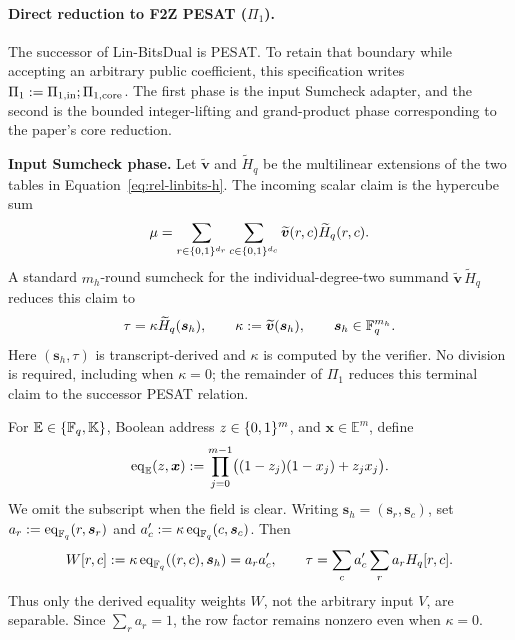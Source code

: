 \paragraph{Direct reduction to F2Z PESAT ($\Pi_1$).}
The successor of Lin-BitsDual is PESAT.  To retain that boundary while accepting an arbitrary public
coefficient, this specification writes
$\Pi_1:=\Pi_{1,{\rm in}};\Pi_{1,{\rm core}}$.  The first phase is the
input Sumcheck adapter, and the second is the bounded
integer-lifting and grand-product phase corresponding to the paper's core
reduction.

\smallskip
\noindent\textbf{Input Sumcheck phase.}
Let $\widetilde{\bm v}$ and $\widetilde H_q$ be the multilinear extensions of
the two tables in Equation~\eqref{eq:rel-linbits-h}.  The incoming scalar
claim is the hypercube sum
\begin{equation}
 \mu=\sum_{r\in\{0,1\}^{d_r}}\sum_{c\in\{0,1\}^{d_c}}
       \widetilde{\bm v}(r,c)\widetilde H_q(r,c).
 \label{eq:shape-incoming-sum}
\end{equation}
A standard $m_h$-round sumcheck for the individual-degree-two summand
$\widetilde{\bm v}\,\widetilde H_q$ reduces this claim to
\begin{equation}
 \tau=\kappa\widetilde H_q(\bm s_h),
 \qquad
 \kappa:=\widetilde{\bm v}(\bm s_h),
 \qquad \bm s_h\in\mathbb F_q^{m_h}.
\end{equation}
Here $(\bm s_h,\tau)$ is transcript-derived and $\kappa$ is computed by the
verifier.  No division is required, including when $\kappa=0$; the remainder
of $\Pi_1$ reduces this terminal claim to the successor PESAT relation.

For $\mathbb E\in\{\mathbb F_q,\mathbb K\}$, Boolean address $z\in\{0,1\}^m$, and
$\bm x\in\mathbb E^m$, define
\begin{equation}
 \operatorname{eq}_{\mathbb E}(z,\bm x):=
 \prod_{j=0}^{m-1}
 \bigl((1-z_j)(1-x_j)+z_jx_j\bigr).
 \label{eq:typed-equality-polynomial}
\end{equation}
We omit the subscript when the field is clear.  Writing
$\bm s_h=(\bm s_r,\bm s_c)$, set
$a_r:=\operatorname{eq}_{\mathbb F_q}(r,\bm s_r)$ and
$a'_c:=\kappa\operatorname{eq}_{\mathbb F_q}(c,\bm s_c)$.  Then
\begin{equation}
 W[r,c]:=\kappa\operatorname{eq}_{\mathbb F_q}((r,c),\bm s_h)=a_ra'_c,
 \qquad
 \tau=\sum_c a'_c\sum_r a_rH_q[r,c].
\end{equation}
Thus only the derived equality weights $W$, not the arbitrary input $V$, are
separable.  Since $\sum_r a_r=1$, the row factor remains nonzero even when
$\kappa=0$.

